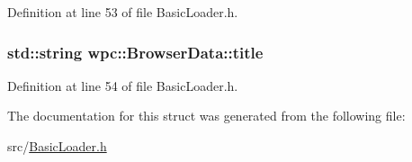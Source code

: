 Definition at line 53 of file Basic\-Loader.\-h.

\hypertarget{structwpc_1_1_browser_data_a7d1185398cb655f8d8e874ca34c5e852}{
\subsubsection[{title}]{\setlength{\rightskip}{0pt plus 5cm}std\-::string wpc\-::\-Browser\-Data\-::title}}\label{structwpc_1_1_browser_data_a7d1185398cb655f8d8e874ca34c5e852}


Definition at line 54 of file Basic\-Loader.\-h.



The documentation for this struct was generated from the following file\-:\begin{DoxyCompactItemize}
\item 
src/\hyperlink{_basic_loader_8h}{Basic\-Loader.\-h}\end{DoxyCompactItemize}
